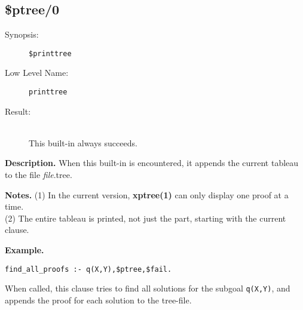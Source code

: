 %
%
%
\subsection{\$ptree/0}

\begin{description}
\item[Synopsis:]
	{\tt \$printtree}
\item[Low Level Name:]
	{\tt printtree }
\item[Result:]\ \\
This built-in always succeeds.
\end{description}

\vspace*{0.5cm}
\noindent
{\bf Description.}
When this built-in is encountered, it appends the current tableau
to the file {\em file}.tree.

\vspace*{0.5cm}
\noindent
{\bf Notes.}
(1) In the current version, {\bf xptree(1)} can only display one proof at a time.\\
(2) The entire tableau is printed, not just the part, starting with the
current clause.

\vspace*{0.5cm}
\noindent
{\bf Example.}
\begin{verbatim}
find_all_proofs :- q(X,Y),$ptree,$fail.
\end{verbatim}
When called, this clause tries to find all solutions for the subgoal
{\tt q(X,Y)}, and appends the proof for each solution to the tree-file.


